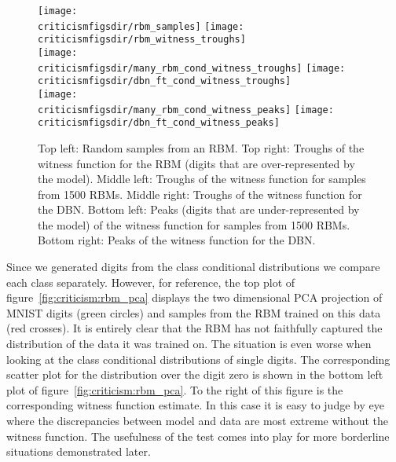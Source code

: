 \begin{figure}[ht]
\centering
\texttt{[image: \\criticismfigsdir/rbm\_samples]}
\texttt{[image: \\criticismfigsdir/rbm\_witness\_troughs]}
\\
\texttt{[image: \\criticismfigsdir/many\_rbm\_cond\_witness\_troughs]}
\texttt{[image: \\criticismfigsdir/dbn\_ft\_cond\_witness\_troughs]}
\\
\texttt{[image: \\criticismfigsdir/many\_rbm\_cond\_witness\_peaks]}
\texttt{[image: \\criticismfigsdir/dbn\_ft\_cond\_witness\_peaks]}
\caption[A variety of digit samples from RBMs and DBNs and troughs and peaks of witness functions.]{
Top left: Random samples from an RBM.
Top right: Troughs of the witness function for the RBM (digits that are over-represented by the model).
Middle left: Troughs of the witness function for samples from 1500 RBMs.
Middle right: Troughs of the witness function for the DBN.
Bottom left: Peaks (digits that are under-represented by the model) of the witness function for samples from 1500 RBMs.
Bottom right: Peaks of the witness function for the DBN.
}
\label{fig:digits}
\end{figure}

Since we generated digits from the class conditional distributions we compare each class separately.
However, for reference, the top plot of figure~\ref{fig:criticism:rbm_pca} displays the two dimensional PCA projection of MNIST digits (green circles) and samples from the RBM trained on this data (red crosses).
It is entirely clear that the RBM has not faithfully captured the distribution of the data it was trained on.
The situation is even worse when looking at the class conditional distributions of single digits.
The corresponding scatter plot for the distribution over the digit zero is shown in the bottom left plot of figure~\ref{fig:criticism:rbm_pca}.
To the right of this figure is the corresponding witness function estimate.
In this case it is easy to judge by eye where the discrepancies between model and data are most extreme without the witness function.
The usefulness of the test comes into play for more borderline situations demonstrated later.

